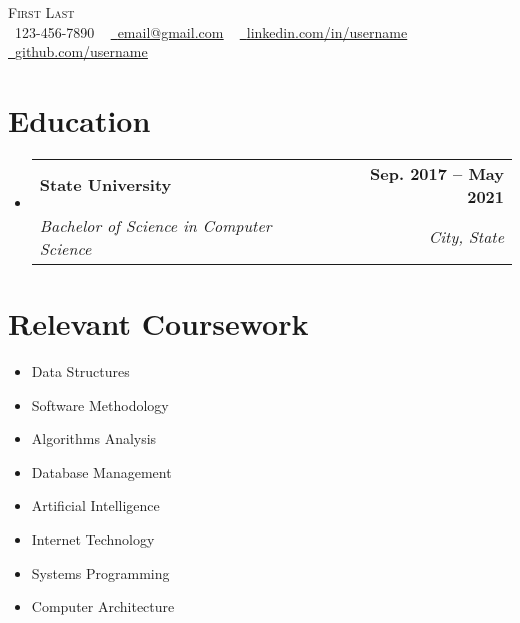 \documentclass[letterpaper,11pt]{ctexart}
\makeatletter
\newcommand{\resumeSubheading}[4]{
    \vspace{-2pt}\item
    \begin{tabular*}{1.0\textwidth}[t]{l@{\extracolsep{\fill}}r}
        \textbf{#1} & \textbf{\small #2} \\
        \textit{\small#3} & \textit{\small #4} \\
    \end{tabular*}\vspace{-7pt}
}
\newcommand{\resumeSubHeadingListStart}{\begin{itemize}[leftmargin=0.0in, label={}]}
\newcommand{\resumeSubHeadingListEnd}{\end{itemize}}
\makeatother
\begin{document}

\begin{center}
{\Huge \scshape First Last} \\ \vspace{1pt}
\small \raisebox{-0.1\height}\faPhone\ 123-456-7890 ~ \href{mailto:x@gmail.com}{\raisebox{-0.2\height}\faEnvelope\  \underline{email@gmail.com}} ~
\href{https://linkedin.com/in//}{\raisebox{-0.2\height}\faLinkedin\ \underline{linkedin.com/in/username}}  ~
\href{https://github.com/}{\raisebox{-0.2\height}\faGithub\ \underline{github.com/username}}
\vspace{-8pt}
\end{center}


\section{Education}
\resumeSubHeadingListStart
\resumeSubheading
{State University}{Sep. 2017 -- May 2021}
{Bachelor of Science in Computer Science}{City, State}
\resumeSubHeadingListEnd

\section{Relevant Coursework}
\begin{multicols}{4}
\begin{itemize}[itemsep=-5pt, parsep=3pt]
\item\small Data Structures
\item Software Methodology
\item Algorithms Analysis
\item Database Management
\item Artificial Intelligence
\item Internet Technology
\item Systems Programming
\item Computer Architecture
\end{itemize}
\end{multicols}
\vspace*{2.0\multicolsep}
\end{document}
